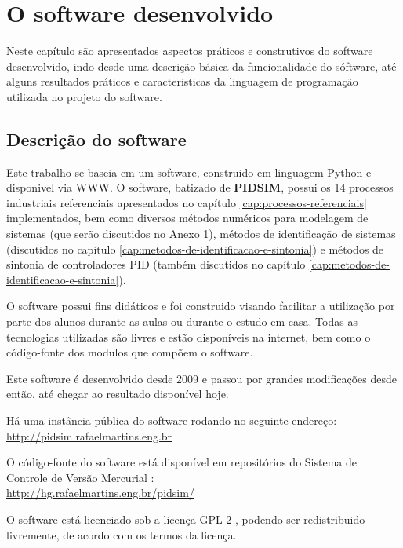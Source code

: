 \chapter{O software desenvolvido \label{cap:software}}

Neste capítulo são apresentados aspectos práticos e construtivos do
software desenvolvido, indo desde uma descrição básica da funcionalidade
do sóftware, até alguns resultados práticos e caracteristicas da linguagem
de programação utilizada no projeto do software.

\section{Descrição do software}

    Este trabalho se baseia em um software, construido em linguagem Python
    e disponivel via \ac{WWW}. O software, batizado de \textbf{PIDSIM},
    possui os 14 processos industriais referenciais apresentados no capítulo
    \ref{cap:processos-referenciais} implementados, bem como diversos
    métodos numéricos para modelagem de sistemas (que serão discutidos no
    Anexo 1), métodos de identificação de sistemas (discutidos no capítulo
    \ref{cap:metodos-de-identificacao-e-sintonia}) e métodos de sintonia de
    controladores \acs{PID} (também discutidos no capítulo
    \ref{cap:metodos-de-identificacao-e-sintonia}).

    O software possui fins didáticos e foi construido visando facilitar a
    utilização por parte dos alunos durante as aulas ou durante o estudo em casa.
    Todas as tecnologias utilizadas são livres e estão disponíveis na internet,
    bem como o código-fonte dos modulos que compõem o software.

    Este software é desenvolvido desde 2009 e passou por grandes modificações
    desde então, até chegar ao resultado disponível hoje.

    Há uma instância pública do software rodando no seguinte endereço: \\
    \url{http://pidsim.rafaelmartins.eng.br}

    O código-fonte do software está disponível em repositórios do Sistema
    de Controle de Versão Mercurial \cite{Mercurial}: \\
    \url{http://hg.rafaelmartins.eng.br/pidsim/}

    O software está licenciado sob a licença \ac{GPL-2} \cite{GPL-2}, podendo ser redistribuido
    livremente, de acordo com os termos da licença.

